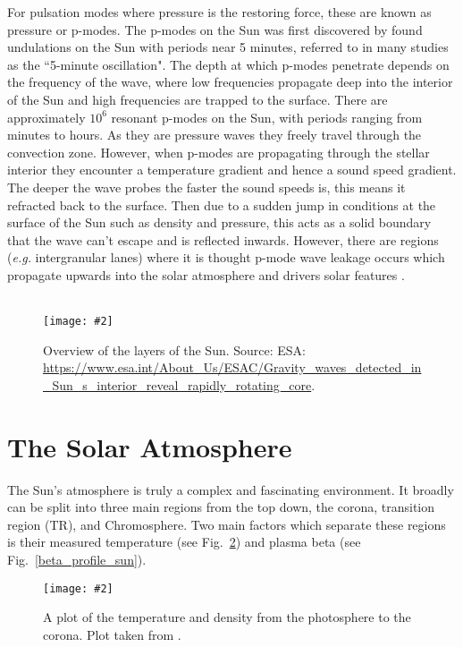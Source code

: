 \documentclass[12pt]{ociamthesis}
\newcommand{\mfig}[4]{
  \begin{figure}
  \begin{center}
  \texttt{[image: \#2]}
  \caption{#3}
  \label{#4}
  \end{center}
  \end{figure}}
\newcommand{\np}{\\ \\}
\begin{document}
For pulsation modes where pressure is the restoring force, these are known as pressure or p-modes. The p-modes on the Sun was first discovered by \cite{Leighton1962ApJ135474L} found undulations on the Sun with periods near 5 minutes, referred to in many studies as the ``5-minute oscillation". The depth at which p-modes penetrate depends on the frequency of the wave, where low frequencies propagate deep into the interior of the Sun and high frequencies are trapped to the surface. There are approximately $10^6$ resonant p-modes on the Sun, with periods ranging from minutes to hours. As they are pressure waves they freely travel through the convection zone. However, when p-modes are propagating through the stellar interior they encounter a temperature gradient and hence a sound speed gradient. The deeper the wave probes the faster the sound speeds is, this means it refracted back to the surface. Then due to a sudden jump in conditions at the surface of the Sun such as density and pressure, this acts as a solid boundary that the wave can't escape and is reflected inwards. However, there are regions (\textit{e.g.} intergranular lanes) where it is thought p-mode wave leakage occurs which propagate upwards into the solar atmosphere and drivers solar features \citep{Suematsu1990LNP367211S, Pontieu2005ApJ624L61D, Heggland2007ApJ6661277H, Pontieu2004Natur}. \np
\mfig{0.8}{figures/image10.png}{Overview of the layers of the Sun. Source: ESA: \url{https://www.esa.int/About_Us/ESAC/Gravity_waves_detected_in_Sun_s_interior_reveal_rapidly_rotating_core}.}{on_model}
\section{The Solar Atmosphere}
\label{sec:sol_atmos}
The Sun's atmosphere is truly a complex and fascinating environment. It broadly can be split into three main regions from the top down, the corona, transition region (TR), and Chromosphere. Two main factors which separate these regions is their measured temperature (see Fig.~\ref{t_profile_sun}) and plasma beta (see Fig.~\ref{beta_profile_sun}).
\mfig{0.725}{figures/T_regoins}{A plot of the temperature and density from the photosphere to the corona. Plot taken from \cite{Lang_2006ses}.}{t_profile_sun}
\end{document}
